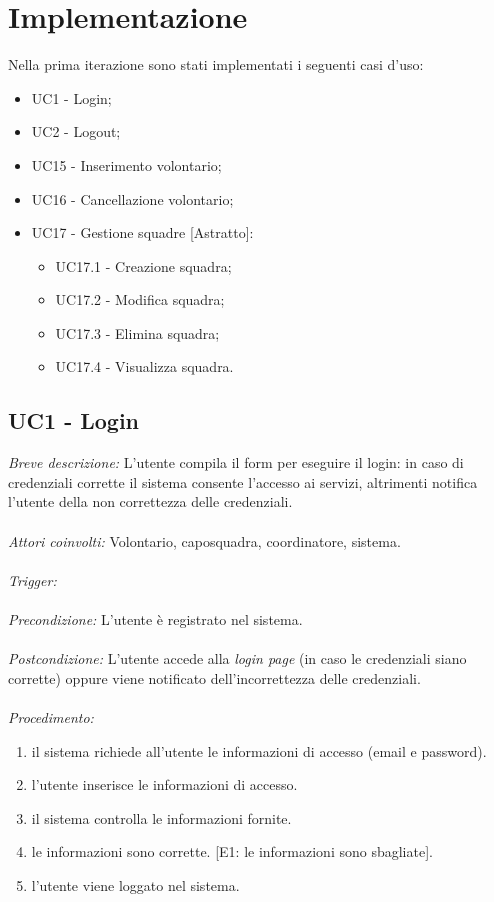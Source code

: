 \section{Implementazione}
Nella prima iterazione  sono stati implementati i seguenti casi d'uso:
\begin{itemize}
	\item UC1 - Login;
	\item UC2 - Logout;
	\item UC15 - Inserimento volontario;
	\item UC16 - Cancellazione volontario;
	\item UC17 - Gestione squadre [Astratto]:
	\begin{itemize}
		\item UC17.1 - Creazione squadra;
		\item UC17.2 - Modifica squadra;
		\item UC17.3 - Elimina squadra;
		\item UC17.4 - Visualizza squadra.
	\end{itemize}
\end{itemize}

\subsection{UC1 - Login}
\textit{Breve descrizione:} L'utente compila il form per eseguire il login: in caso di credenziali corrette il sistema consente l'accesso ai servizi, altrimenti notifica l'utente della non correttezza delle credenziali. 
\\
\\
\textit{Attori coinvolti:} Volontario, caposquadra, coordinatore, sistema.
\\
\\
\textit{Trigger:}
\\
\\
\textit{Precondizione:} L'utente è registrato nel sistema.
\\
\\
\textit{Postcondizione:} L'utente accede alla \textit{login page} (in caso le credenziali siano corrette) oppure viene notificato dell'incorrettezza delle credenziali.
\\
\\
\textit{Procedimento:}
\begin{enumerate}
	\item il sistema richiede all'utente le informazioni di accesso (email e password).
	\item l'utente inserisce le informazioni di accesso.
	\item il sistema controlla le informazioni fornite.
	\item le informazioni sono corrette. [E1: le informazioni sono sbagliate].
	\item l'utente viene loggato nel sistema.
\end{enumerate}


